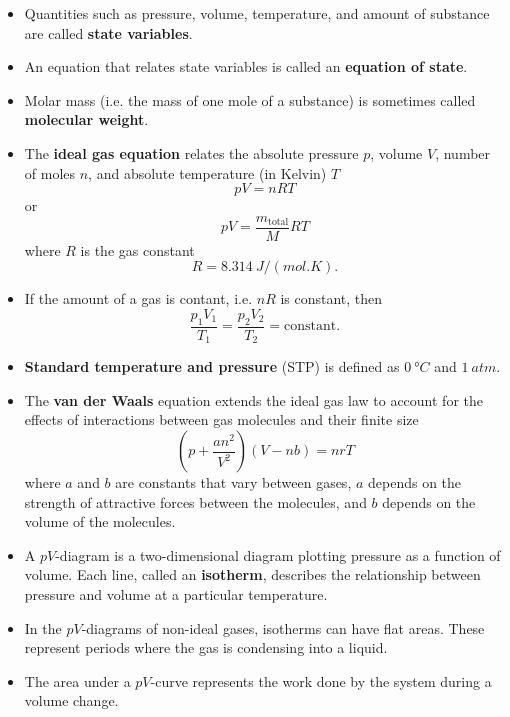 \documentclass{article}
\begin{document}
\begin{itemize}
  \item Quantities such as pressure, volume, temperature, and amount of substance are called \textbf{state variables}.

  \item An equation that relates state variables is called an \textbf{equation of state}.

  \item Molar mass (i.e. the mass of one mole of a substance) is sometimes called \textbf{molecular weight}.

  \item The \textbf{ideal gas equation} relates the absolute pressure $p$, volume $V$, number of moles $n$, and absolute temperature (in Kelvin) $T$ \[p V = n R T\] or \[p V = \frac{m_\text{total}}{M} RT\] where $R$ is the gas constant \[R = \qty{8.314}{J/(mol.K)}.\]

  \item If the amount of a gas is contant, i.e. $n R$ is constant, then \[\frac{p_1 V_1}{T_1} = \frac{p_2 V_2}{T_2} = \text{constant}.\]

  \item \textbf{Standard temperature and pressure} (STP) is defined as $\qty{0}{\degree C}$ and $\qty{1}{atm}$.

  \item The \textbf{van der Waals} equation extends the ideal gas law to account for the effects of interactions between gas molecules and their finite size \[\left( p + \frac{a n^2}{V^2} \right) (V - n b) = n r T\] where $a$ and $b$ are constants that vary between gases, $a$ depends on the strength of attractive forces between the molecules, and $b$ depends on the volume of the molecules.

  \item A $p V$-diagram is a two-dimensional diagram plotting pressure as a function of volume. Each line, called an \textbf{isotherm}, describes the relationship between pressure and volume at a particular temperature.

  \item In the $p V$-diagrams of non-ideal gases, isotherms can have flat areas. These represent periods where the gas is condensing into a liquid.

  \item The area under a $p V$-curve represents the work done by the system during a volume change.
\end{itemize}
\end{document}
